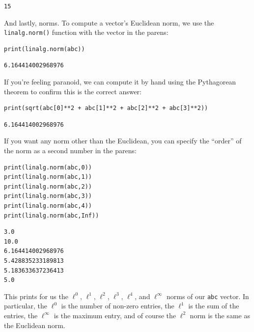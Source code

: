 \begin{Verbatim}[fontsize=\small,samepage=true,frame=leftline,framesep=5mm,framerule=1mm]
15
\end{Verbatim}

\pagebreak
{}

And lastly, norms. To compute a vector's Euclidean norm, we use the
\texttt{linalg.norm()} function with the vector in the parens:

\label{pythonNorm}

\begin{Verbatim}[fontsize=\small,samepage=true,frame=single,framesep=3mm]
print(linalg.norm(abc))
\end{Verbatim}
\vspace{-.2in}

\begin{Verbatim}[fontsize=\small,samepage=true,frame=leftline,framesep=5mm,framerule=1mm]
6.164414002968976
\end{Verbatim}

If you're feeling paranoid, we can compute it by hand using the Pythagorean
theorem to confirm this is the correct answer:

\begin{Verbatim}[fontsize=\small,samepage=true,frame=single,framesep=3mm]
print(sqrt(abc[0]**2 + abc[1]**2 + abc[2]**2 + abc[3]**2))
\end{Verbatim}
\vspace{-.2in}

\begin{Verbatim}[fontsize=\small,samepage=true,frame=leftline,framesep=5mm,framerule=1mm]
6.164414002968976
\end{Verbatim}

If you want any norm other than the Euclidean, you can specify the ``order'' of
the norm as a second number in the parens:

\begin{Verbatim}[fontsize=\small,samepage=true,frame=single,framesep=3mm]
print(linalg.norm(abc,0))
print(linalg.norm(abc,1))
print(linalg.norm(abc,2))
print(linalg.norm(abc,3))
print(linalg.norm(abc,4))
print(linalg.norm(abc,Inf))
\end{Verbatim}
\vspace{-.2in}

\begin{Verbatim}[fontsize=\small,samepage=true,frame=leftline,framesep=5mm,framerule=1mm]
3.0
10.0
6.164414002968976
5.428835233189813
5.183633637236413
5.0
\end{Verbatim}

This prints for us the $\ell^0$, $\ell^1$, $\ell^2$, $\ell^3$, $\ell^4$, and
$\ell^\infty$ norms of our \texttt{abc} vector. In particular, the $\ell^0$ is
the number of non-zero entries, the $\ell^1$ is the sum of the entries, the
$\ell^\infty$ is the maximum entry, and of course the $\ell^2$ norm is the same
as the Euclidean norm.
